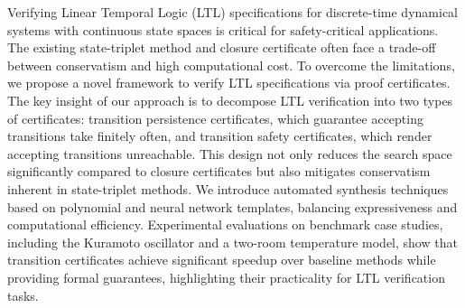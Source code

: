 Verifying Linear Temporal Logic (LTL) specifications for discrete-time dynamical systems with continuous state spaces is critical for safety-critical applications. The existing state-triplet method and closure certificate often face a trade-off between conservatism and high computational cost. To overcome the limitations, we propose a novel framework to verify LTL specifications via proof certificates. The key insight of our approach is to decompose LTL verification into two types of certificates: transition persistence certificates, which guarantee accepting transitions take finitely often, and transition safety certificates, which render accepting transitions unreachable. This design not only reduces the search space significantly compared to closure certificates but also mitigates conservatism inherent in state-triplet methods. We introduce automated synthesis techniques based on polynomial and neural network templates, balancing expressiveness and computational efficiency. Experimental evaluations on benchmark case studies, including the Kuramoto oscillator and a two-room temperature model, show that transition certificates achieve significant speedup over baseline methods while providing formal guarantees, highlighting their practicality for LTL verification tasks.